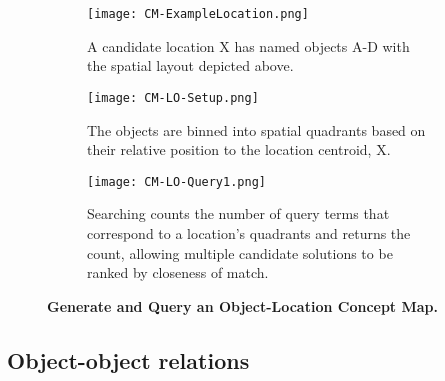 \begin{figure*}[h]
    \centering
    \begin{subfigure}[t]{.3\textwidth}
        \texttt{[image: CM-ExampleLocation.png]}
        \caption{\small A candidate location X has named objects A-D with the spatial layout depicted above.} 
        \label{fig:CM-LO-Example}
    \end{subfigure}
    \hfill
    \begin{subfigure}[t]{.3\textwidth}
        \texttt{[image: CM-LO-Setup.png]}
        \caption{\small The objects are binned into spatial quadrants based on their relative position to the location centroid, X.} 
        \label{fig:CM-LO-Setup}
    \end{subfigure}
    \hfill
        \begin{subfigure}[t]{.3\textwidth}
        \texttt{[image: CM-LO-Query1.png]}
        \caption{\small Searching counts the number of query terms that correspond to a location's quadrants and returns the count, allowing multiple candidate solutions to be ranked by closeness of match.}
        \label{fig:CM-LO-Query}
    \hfill
    \end{subfigure}
    \caption{\textbf{Generate and Query an Object-Location Concept Map.}}\label{figure:ConceptMap-LO} 
\end{figure*}




%



\subsection{Object-object relations}

